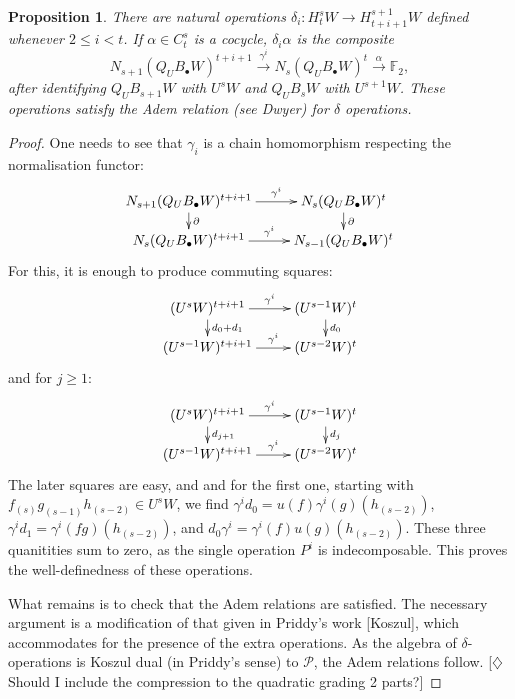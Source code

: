 \documentclass[11pt]{amsart}
\theoremstyle{plain}
\newtheorem{prop}[thm]{Proposition}
\theoremstyle{definition}
\renewcommand{\to}{\longrightarrow}
\newcommand{\calP}{\mathcal{P}}
\theoremstyle{plain}
\newcommand{\Palg}{{\calP}}
\newcommand{\F}{\mathbb{F}}
\begin{document}
\begin{prop}
There are natural operations $\delta_i:H^{s}_tW\to H^{s+1}_{t+i+1}W$ defined whenever $2\leq i <t$. If $\alpha\in C^{s}_t$ is a cocycle, $\delta_i\alpha$ is the composite
\[N_{s+1}(Q_U B_{\bullet}W)^{t+i+1}\overset{\gamma^i}{\to}N_s(Q_U B_{\bullet}W)^{t}\overset{\alpha}{\to}\F_2,\]
after identifying $Q_U B_{s+1}W$ with $U^{s}W$ and $Q_U B_{s}W$ with $U^{s+1}W$. These operations satisfy the Adem relation (see Dwyer) for $\delta$ operations.
\end{prop}
\begin{proof}
One needs to see that $\gamma_i$ is a chain homomorphism respecting the normalisation functor:\[\xymatrix@R=4mm{
N_{s+1}(Q_U B_{\bullet}W)^{t+i+1}\ar[r]^-{\gamma^i}
\ar[d]^-{\partial}&%
N_s(Q_U B_{\bullet}W)^{t}
\ar[d]^-{\partial}
\\%
N_{s}(Q_U B_{\bullet}W)^{t+i+1}\ar[r]^-{\gamma^i}&%
N_{s-1}(Q_U B_{\bullet}W)^{t}%
}\]
For this, it is enough to produce commuting squares:
\[\xymatrix@R=4mm{
(U^sW)^{t+i+1}\ar[r]^-{\gamma^i}
\ar[d]^-{d_0+d_1}&%
(U^{s-1}W)^{t}
\ar[d]^-{d_0}
\\%
(U^{s-1}W)^{t+i+1}\ar[r]^-{\gamma^i}&%
(U^{s-2}W)^{t}%
}\]
and for $j\geq1$:
\[\xymatrix@R=4mm{
(U^sW)^{t+i+1}\ar[r]^-{\gamma^i}
\ar[d]^-{d_{j+1}}&%
(U^{s-1}W)^{t}
\ar[d]^-{d_j}
\\%
(U^{s-1}W)^{t+i+1}\ar[r]^-{\gamma^i}&%
(U^{s-2}W)^{t}%
}\]
The later squares are easy, and and for the first one, starting with $f_{(s)}g_{(s-1)}h_{(s-2)}\in U^sW$, we find $\gamma^i d_0=u(f)\gamma^i (g)(h_{(s-2)})$,
$\gamma^i d_1=\gamma^i (fg)(h_{(s-2)})$, and
$d_0\gamma^i =\gamma^i (f)u(g)(h_{(s-2)})$. These three quanitities sum to zero, as the single operation $P^i$ is indecomposable. This proves the well-definedness of these operations.

What remains is to check that the Adem relations are satisfied. The necessary argument is a modification of that given in Priddy's work [Koszul], which accommodates for the presence of the extra operations. As the algebra of $\delta$-operations is Koszul dual (in Priddy's sense) to $\Palg$, the Adem relations follow. [$\diamondsuit$ Should I include the compression to the quadratic grading 2 parts?]%
\end{proof}
\end{document}
